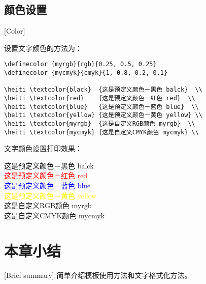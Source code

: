 \subsection{颜色设置}[Color]

设置文字颜色的方法为：
\begin{lstlisting}
\definecolor {myrgb}{rgb}{0.25, 0.5, 0.25}
\definecolor {mycmyk}{cmyk}{1, 0.8, 0.2, 0.1}

\heiti \textcolor{black}  {这是预定义颜色－黑色 balck}  \\
\heiti \textcolor{red}    {这是预定义颜色－红色 red}  \\
\heiti \textcolor{blue}   {这是预定义颜色－蓝色 blue}  \\
\heiti \textcolor{yellow} {这是预定义颜色－黄色 yellow} \\
\heiti \textcolor{myrgb}  {这是自定义RGB颜色 myrgb}  \\
\heiti \textcolor{mycmyk} {这是自定义CMYK颜色 mycmyk} \\
\end{lstlisting}


文字颜色设置打印效果：
\begin{flushleft}
  \xiaosan
  {

    \heiti \textcolor{black}  {这是预定义颜色－黑色 balck}  \\
    \heiti \textcolor{red}    {这是预定义颜色－红色 red}  \\
    \heiti \textcolor{blue}   {这是预定义颜色－蓝色 blue}  \\
    \heiti \textcolor{yellow} {这是预定义颜色－黄色 yellow} \\
    \heiti \textcolor{myrgb}  {这是自定义RGB颜色 myrgb}  \\
    \heiti \textcolor{mycmyk} {这是自定义CMYK颜色 mycmyk} \\
  }
\end{flushleft}

\section*{本章小结}[Brief summary]
简单介绍模板使用方法和文字格式化方法。

